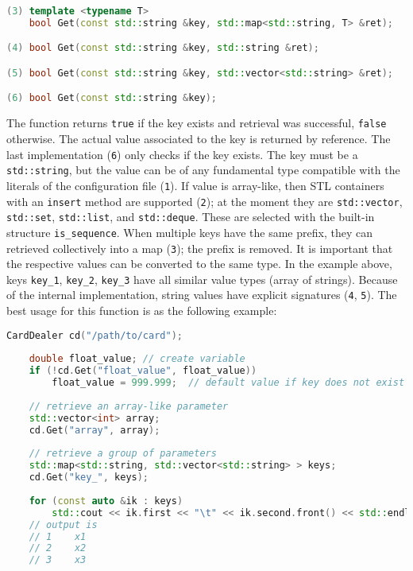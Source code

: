 \documentclass[a4paper, 11pt]{article}
\begin{document}
\begin{lstlisting}[language=C++]
(3) template <typename T>
    bool Get(const std::string &key, std::map<std::string, T> &ret);

(4) bool Get(const std::string &key, std::string &ret);

(5) bool Get(const std::string &key, std::vector<std::string> &ret);

(6) bool Get(const std::string &key);
\end{lstlisting}
The function returns \texttt{true} if the key exists and retrieval was successful, %
\texttt{false} otherwise.
The actual value associated to the key is returned by reference.
The last implementation (\texttt{6}) only checks if the key exists.
The key must be a \texttt{std::string}, but the value can be of any fundamental type compatible with the literals of the configuration file (\texttt{1}).
If value is array-like, then STL containers with an \texttt{insert} method are supported (\texttt{2}); %
at the moment they are \texttt{std::vector},  \texttt{std::set},  \texttt{std::list},  and \texttt{std::deque}. 
These are selected with the built-in structure \texttt{is\_sequence}.
When multiple keys have the same prefix, they can retrieved collectively into a map (\texttt{3}); the prefix is removed.
It is important that the respective values can be converted to the same type.
In the example above, keys \texttt{key\_1}, \texttt{key\_2}, \texttt{key\_3} have all similar value types (array of strings).
Because of the internal implementation, string values have explicit signatures (\texttt{4}, \texttt{5}).
The best usage for this function is as the following example:
\begin{lstlisting}[language=C++]
    CardDealer cd("/path/to/card");
    
    double float_value; // create variable
    if (!cd.Get("float_value", float_value))
    	float_value = 999.999;	// default value if key does not exist
    
    // retrieve an array-like parameter
    std::vector<int> array;
    cd.Get("array", array);
    
    // retrieve a group of parameters
    std::map<std::string, std::vector<std::string> > keys;
    cd.Get("key_", keys);
    
    for (const auto &ik : keys)
    	std::cout << ik.first << "\t" << ik.second.front() << std::endl;
    // output is
    // 1	x1
    // 2	x2
    // 3	x3
\end{lstlisting}
\end{document}
